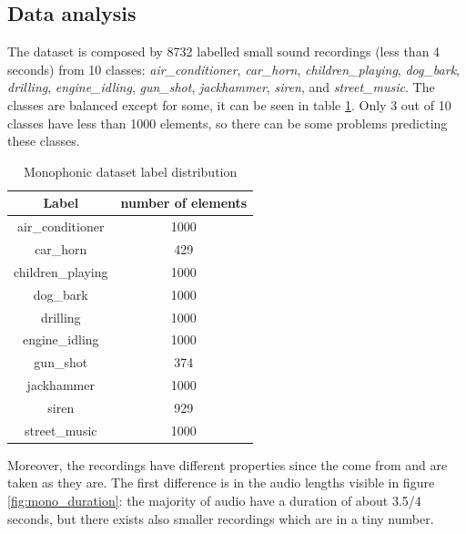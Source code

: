 \documentclass{article}
\begin{document}
\subsection{Data analysis}
\label{subsec:mono_analysis}

The dataset is composed by 8732 labelled small sound recordings (less than 4 seconds) from 10 classes: \textit{air\_conditioner}, \textit{car\_horn}, \textit{children\_playing}, \textit{dog\_bark}, \textit{drilling}, \textit{engine\_idling}, \textit{gun\_shot}, \textit{jackhammer}, \textit{siren}, and \textit{street\_music}. The classes are balanced except for some, it can be seen in table \ref{tab:mono_distribution}. Only 3 out of 10 classes have less than 1000 elements, so there can be some problems predicting these classes.

\begin{table}[H]
	\begin{center}
		\begin{tabular}{ |c | c | }
			\hline
			Label & number of elements \\ 
			\hline
			air\_conditioner & 1000 \\
			\hline
			car\_horn & 429 \\
			\hline
			children\_playing & 1000 \\
			\hline
			dog\_bark & 1000 \\
			\hline
			drilling & 1000 \\
			\hline
			engine\_idling & 1000 \\
			\hline
			gun\_shot & 374 \\
			\hline
			jackhammer & 1000 \\
			\hline
			siren & 929 \\
			\hline
			street\_music & 1000 \\
			\hline
		\end{tabular}
		\caption{Monophonic dataset label distribution}
		\label{tab:mono_distribution}
	\end{center}
\end{table}

Moreover, the recordings have different properties since the come from \href{www.freesound.org}{} and are taken as they are. The first difference is in the audio lengths visible in figure \ref{fig:mono_duration}: the majority of audio have a duration of about 3.5/4 seconds, but there exists also smaller recordings which are in a tiny number.
\end{document}
